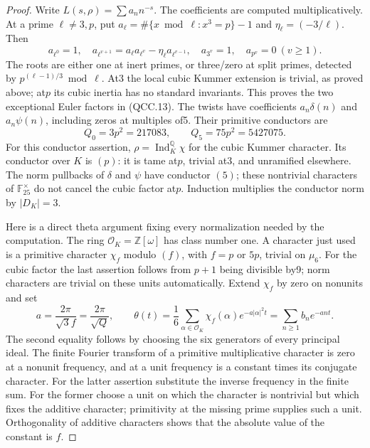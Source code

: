 \begin{proof}
Write $L(s,\rho)=\sum a_n n^{-s}$.  The coefficients are computed
multiplicatively.  At a prime $\ell\ne3,p$, put
$a_\ell=\#\{x\bmod\ell:x^3=p\}-1$ and
$\eta_\ell=(-3/\ell)$.  Then
\[
 a_{\ell^0}=1,\quad
 a_{\ell^{v+1}}=a_\ell a_{\ell^v}-\eta_\ell a_{\ell^{v-1}},
 \quad a_{3^v}=1,\quad a_{p^v}=0\ (v\ge1).
 \tag{QCC.13}
\]
The roots are either one at inert primes, or three/zero at split
primes, detected by $p^{(\ell-1)/3}\bmod\ell$.
At3 the local cubic Kummer extension is trivial, as proved above;
at$p$ its cubic inertia has no standard invariants.  This proves the
two exceptional Euler factors in (QCC.13).
The twists have coefficients $a_n\delta(n)$ and $a_n\psi(n)$,
including zeros at multiples of5.  Their primitive conductors are
\[
                    Q_0=3p^2=217083,\qquad
                    Q_5=75p^2=5427075.
 \tag{QCC.14}
\]
For this conductor assertion, $\rho=\operatorname{Ind}_{K}^{\mathbb Q}\chi$
for the cubic Kummer character.  Its conductor over $K$ is $(p)$:
it is tame at$p$, trivial at3, and unramified elsewhere.  The norm
pullbacks of $\delta$ and $\psi$ have conductor $(5)$; these nontrivial
characters of $\mathbb F_{25}^\times$ do not cancel the cubic factor
at$p$.  Induction multiplies the conductor norm by $|D_K|=3$.

Here is a direct theta argument fixing every normalization needed
by the computation.  The ring $\mathcal O_K=\mathbb Z[\omega]$ has
class number one.  A character just used is a primitive character
$\chi_f$ modulo $(f)$, with $f=p$ or $5p$, trivial on $\mu_6$.
For the cubic factor the last assertion follows from $p+1$ being
divisible by9; norm characters are trivial on these units automatically.
Extend $\chi_f$ by zero on nonunits and set
\[
 a=\frac{2\pi}{\sqrt3 f}=\frac{2\pi}{\sqrt Q},\qquad
 \theta(t)=\frac16\sum_{\alpha\in\mathcal O_K}
       \chi_f(\alpha)e^{-a|\alpha|^2t}
       =\sum_{n\ge1}b_n e^{-ant}.
 \tag{QCC.15}
\]
The second equality follows by choosing the six generators of every
principal ideal.  The finite Fourier transform of a primitive
multiplicative character is zero at a nonunit frequency, and at a
unit frequency is a constant times its conjugate character.
For the latter assertion substitute the inverse frequency in the
finite sum.  For the former choose a unit on which the character is
nontrivial but which fixes the additive character; primitivity at the
missing prime supplies such a unit.  Orthogonality of additive
characters shows that the absolute value of the constant is $f$.


\end{proof}
